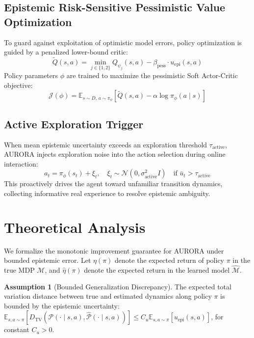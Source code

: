 \documentclass[11pt,a4paper]{article}
\theoremstyle{definition}
\newtheorem{assumption}{Assumption}
\theoremstyle{remark}
\begin{document}
\subsection{Epistemic Risk-Sensitive Pessimistic Value Optimization}
To guard against exploitation of optimistic model errors, policy optimization is guided by a penalized lower-bound critic:
\begin{equation}
\label{eq:pessimistic_q}
    \tilde{Q}(s, a) = \min_{j \in \{1, 2\}} Q_{\psi_j}(s, a) - \beta_{\text{pess}} \cdot u_{\text{epi}}(s, a)
\end{equation}
Policy parameters $\phi$ are trained to maximize the pessimistic Soft Actor-Critic objective:
\begin{equation}
    \mathcal{J}(\phi) = \mathbb{E}_{s \sim D,\, a \sim \pi_\phi} \left[ \tilde{Q}(s, a) - \alpha \log \pi_\phi(a \mid s) \right]
\end{equation}

\subsection{Active Exploration Trigger}
When mean epistemic uncertainty exceeds an exploration threshold $\tau_{\text{active}}$, AURORA injects exploration noise into the action selection during online interaction:
\begin{equation}
    a_t = \pi_\phi(s_t) + \xi_t, \quad \xi_t \sim \mathcal{N}\left(0, \sigma_{\text{active}}^2 I\right) \quad \text{if } \bar{u}_t > \tau_{\text{active}}
\end{equation}
This proactively drives the agent toward unfamiliar transition dynamics, collecting informative real experience to resolve epistemic ambiguity.

\section{Theoretical Analysis}
\label{sec:theory}

We formalize the monotonic improvement guarantee for AURORA under bounded epistemic error. Let $\eta(\pi)$ denote the expected return of policy $\pi$ in the true MDP $\mathcal{M}$, and $\hat{\eta}(\pi)$ denote the expected return in the learned model $\hat{\mathcal{M}}$.

\begin{assumption}[Bounded Generalization Discrepancy]
\label{ass:error}
The expected total variation distance between true and estimated dynamics along policy $\pi$ is bounded by the epistemic uncertainty: $\mathbb{E}_{s, a \sim \pi} \left[ D_{\text{TV}}\left( \mathcal{P}(\cdot \mid s, a), \hat{\mathcal{P}}(\cdot \mid s, a) \right) \right] \le C_u \mathbb{E}_{s, a \sim \pi} [u_{\text{epi}}(s, a)]$, for constant $C_u > 0$.
\end{assumption}
\end{document}

